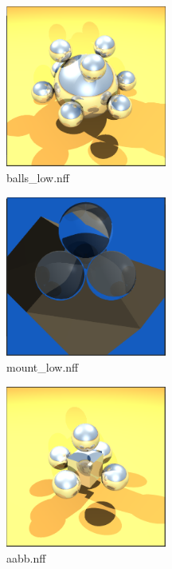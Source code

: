 \documentclass[twocolumn]{article}
\begin{document}
    \begin{figure}[h!]
        \centering
        \includegraphics[width=200px]{balls_low.png}
        \caption{balls\_low.nff}
        \label{fig:balls_low}
    \end{figure}

    \begin{figure}[h!]
        \centering
        \includegraphics[width=200px]{mount_low.png}
        \caption{mount\_low.nff}
        \label{fig:mount_low}
    \end{figure}

    \begin{figure}[h!]
        \centering
        \includegraphics[width=200px]{aabb.png}
        \caption{aabb.nff}
        \label{fig:aabb}
    \end{figure}
\end{document}
